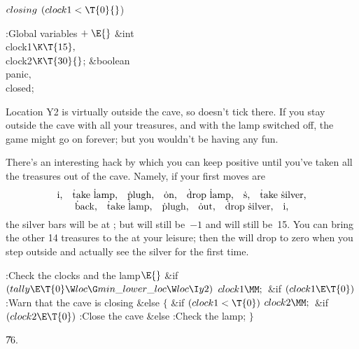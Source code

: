 \Y\B\4\D$\\{closing}$ \5
$(\\{clock1}<\T{0}{}$)\par
\Y\B\4:Global variables\X${}\mathrel+\E{}$\6
\&{int} \\{clock1}${}\K\T{15},{}$ \\{clock2}${}\K\T{30}{}$;\6
\&{boolean} \\{panic}${},{}$ \\{closed};\par
\fi

Location Y2 is virtually outside the cave, so  doesn't tick there.
If you stay outside the cave with all your treasures, and with the lamp
switched off, the game might go on forever; but you wouldn't be having
any fun.

There's an interesting hack by which you can keep  positive
until you've taken all the treasures out of the cave. Namely, if your
first moves are
$$\vcenter{\halign{\hfil\hbox{#}\hfil\cr
\.{in},\quad \.{take} \.{lamp},\quad \.{plugh},\quad \.{on},\quad \.{drop} \.{lamp},\quad \.s,\quad
\.{take} \.{silver},\cr
\.{back},\quad \.{take} \.{lamp},\quad \.{plugh},\quad \.{out},\quad
\.{drop} \.{silver},\quad \.{in},\cr}}$$
the silver bars will be at ; but  will still be~$-1$
and  will still be~15. You can bring the other 14 treasures to the
 at your leisure; then the  will drop to zero when you step
outside and actually see the silver for the first time.

\Y\B\4:Check the clocks and the lamp\X${}\E{}$\6
\&{if} ${}(\\{tally}\E\T{0}\W\\{loc}\G\\{min\_lower\_loc}\W\\{loc}\I\\{y2}){}$\1\5
${}\\{clock1}\MM;{}$\2\6
\&{if} ${}(\\{clock1}\E\T{0}){}$\1\5
:Warn that the cave is closing\X\2\6
\&{else}\5
${}\{{}$\1\6
\&{if} ${}(\\{clock1}<\T{0}){}$\1\5
${}\\{clock2}\MM;{}$\2\6
\&{if} ${}(\\{clock2}\E\T{0}){}$\1\5
:Close the cave\X\2\6
\&{else}\1\5
:Check the lamp\X;\2\6
\4${}\}{}$\2\par
\U76.\fi

